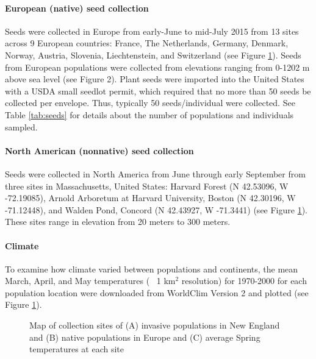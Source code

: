 \documentclass[12pt]{article}\usepackage[]{graphicx}\usepackage[]{color}
\begin{document}
	\paragraph{European (native) seed collection} 
	Seeds were collected in Europe from early-June to mid-July 2015 from 13 sites across 9 European countries: France, The Netherlands, Germany, Denmark, Norway, Austria, Slovenia, Liechtenstein, and Switzerland (see Figure \ref{fig:sites}). Seeds from European populations were collected from elevations ranging from 0-1202 m above sea level (see Figure 2). Plant seeds were imported into the United States with a USDA small seedlot permit, which required that no more than 50 seeds be collected per envelope. Thus, typically 50 seeds/individual were collected. See Table \ref{tab:seeds} for details about the number of populations and individuals sampled. 
   \paragraph{North American (nonnative) seed collection} Seeds were collected in North America from June through early September from three sites in Massachusetts, United States:  Harvard Forest (N 42.53096, W -72.19085), Arnold Arboretum at Harvard University, Boston (N 42.30196, W -71.12448), and Walden Pond, Concord (N 42.43927, W -71.3441) (see Figure \ref{fig:sites}). These sites range in elevation from 20 meters to 300 meters. 
	
	\paragraph{Climate}
	To examine how climate varied between populations and continents, the mean March, April, and May temperatures (~ 1 km$^2$ resolution) for 1970-2000 for each population location were downloaded from WorldClim Version 2 \parencite{Fick2017}  and plotted (see Figure \ref{fig:sites}). 
	
	
	\begin{figure}
		\centering
		\caption{Map of collection sites of (A) invasive populations in New England and (B) native populations in Europe and (C) average Spring temperatures at each site}
		\label{fig:sites}
	\end{figure}
\end{document}
